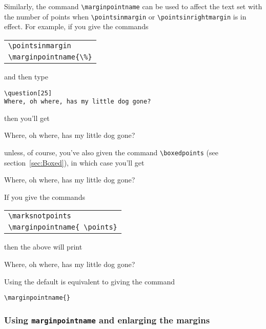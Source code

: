 \documentclass[12pt]{exam}
\begin{document}
Similarly, the command \verb"\marginpointname" can be used to affect
the text set with the number of points when \verb"\pointsinmargin" or
\verb"\pointsinrightmargin" is in effect.  For example, if you give
the commands
\begin{center}
  \begin{tabular}{l}
    \verb"\pointsinmargin"\\
    \verb"\marginpointname{\%}"
  \end{tabular}
\end{center}
and then type
\begin{verbatim}
\question[25]
Where, oh where, has my little dog gone?
\end{verbatim}
then you'll get
\pointsinmargin
\noboxedpoints
\marginpointname{\%}
\begin{questions}
\question[25]
Where, oh where, has my little dog gone?
\end{questions}
unless, of course, you've also given the command \verb"\boxedpoints"
(see section~\ref{sec:Boxed}), in which case you'll get
%
\pointsinmargin
\boxedpoints
\marginpointname{\%}
\begin{questions}
\question[25]
Where, oh where, has my little dog gone?
\end{questions}
If you give the commands
\begin{center}
  \begin{tabular}{l}
    \verb"\marksnotpoints"\\
    \verb"\marginpointname{ \points}"
  \end{tabular}
\end{center}
then the above will print
\noboxedpoints
\marginpointname{ \points}
\marksnotpoints
\begin{questions}
\question[25]
Where, oh where, has my little dog gone?
\end{questions}
\nopointsinmargin
\marginpointname{}





Using the default is equivalent to giving the command
\begin{center}
  \verb"\marginpointname{}"
\end{center}

\subsubsection{Using \texttt{marginpointname} and enlarging the
  margins}
\end{document}
